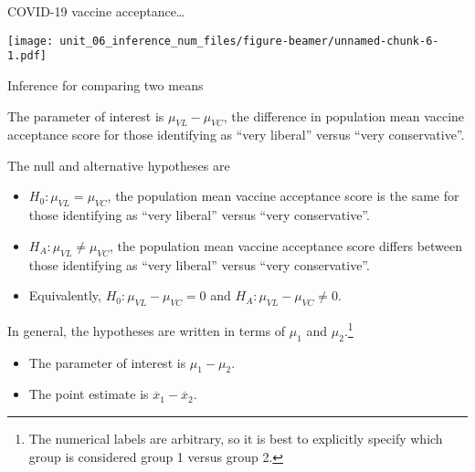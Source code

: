 \documentclass[
  ignorenonframetext,
  aspectratio=169]{beamer}
\begin{document}
\begin{frame}{COVID-19 vaccine acceptance\ldots{}}
\protect\hypertarget{covid-19-vaccine-acceptance-1}{}
\scriptsize

\texttt{[image: unit\_06\_inference\_num\_files/figure-beamer/unnamed-chunk-6-1.pdf]}
\end{frame}

\begin{frame}{Inference for comparing two means}
\protect\hypertarget{inference-for-comparing-two-means}{}
\small

The parameter of interest is \(\mu_{VL} - \mu_{VC}\), the difference in
population mean vaccine acceptance score for those identifying as ``very
liberal'' versus ``very conservative''.

The null and alternative hypotheses are

\begin{itemize}
\item
  \(H_0: \mu_{VL} = \mu_{VC}\), the population mean vaccine acceptance
  score is the same for those identifying as ``very liberal'' versus
  ``very conservative''.
\item
  \(H_A: \mu_{VL} \neq \mu_{VC}\), the population mean vaccine
  acceptance score differs between those identifying as ``very liberal''
  versus ``very conservative''.
\item
  Equivalently, \(H_0: \mu_{VL} - \mu_{VC} = 0\) and
  \(H_A: \mu_{VL} - \mu_{VC} \neq 0\).
\end{itemize}

In general, the hypotheses are written in terms of \(\mu_1\) and
\(\mu_2\).\footnote{The numerical labels are arbitrary, so it is best to explicitly specify which group is considered group 1 versus group 2.}

\begin{itemize}
\item
  The parameter of interest is \(\mu_1 - \mu_2\).
\item
  The point estimate is \(\overline{x}_1 - \overline{x}_2\).
\end{itemize}
\end{frame}
\end{document}
